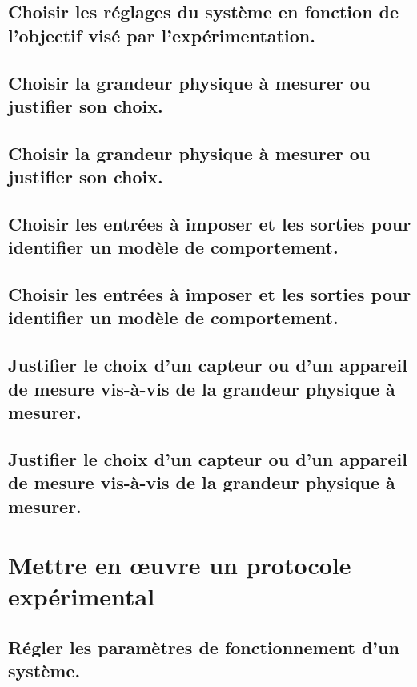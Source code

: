 \documentclass[10pt,fleqn]{book}
\begin{document}
\subsection{Choisir les réglages du système en fonction de l'objectif visé par l'expérimentation.} 

\subsection{Choisir la grandeur physique à mesurer ou justifier son choix.} 

\subsection{Choisir la grandeur physique à mesurer ou justifier son choix.} 

\subsection{Choisir les entrées à imposer et les sorties pour identifier un modèle de comportement.} 

\subsection{Choisir les entrées à imposer et les sorties pour identifier un modèle de comportement.} 

\subsection{Justifier le choix d’un capteur ou d’un appareil de mesure vis-à-vis de la grandeur physique à mesurer.} 

\subsection{Justifier le choix d’un capteur ou d’un appareil de mesure vis-à-vis de la grandeur physique à mesurer.} 

\section{Mettre en œuvre un protocole expérimental} 

\subsection{Régler les paramètres de fonctionnement d'un système.} 
\end{document}
